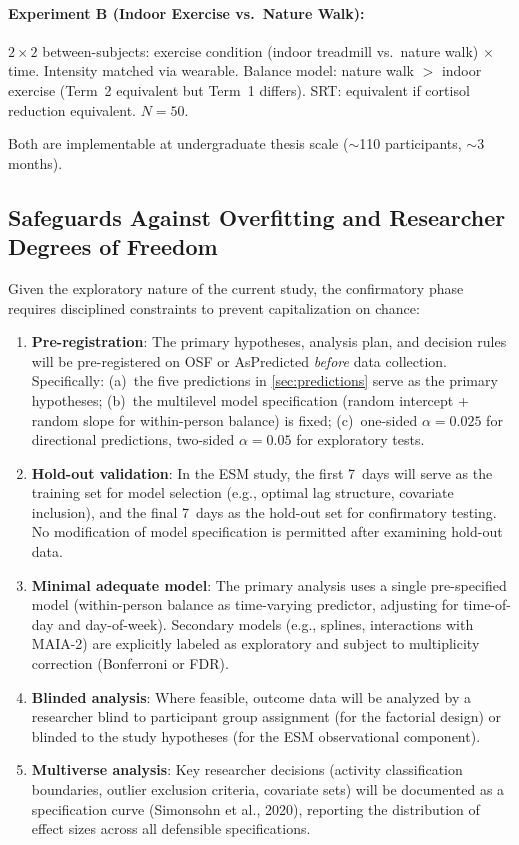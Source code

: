 \documentclass[a4paper,11pt,titlepage]{article}
\begin{document}
\paragraph{Experiment B (Indoor Exercise vs.\ Nature Walk):}
$2 \times 2$ between-subjects: exercise condition (indoor treadmill vs.\ nature walk) $\times$ time. Intensity matched via wearable. Balance model: nature walk $>$ indoor exercise (Term~2 equivalent but Term~1 differs). SRT: equivalent if cortisol reduction equivalent. $N = 50$.

Both are implementable at undergraduate thesis scale ($\sim$110 participants, $\sim$3 months).

\subsection{Safeguards Against Overfitting and Researcher Degrees of Freedom}\label{sec:safeguards}

Given the exploratory nature of the current study, the confirmatory phase requires disciplined constraints to prevent capitalization on chance:

\begin{enumerate}
  \item \textbf{Pre-registration}: The primary hypotheses, analysis plan, and decision rules will be pre-registered on OSF or AsPredicted \emph{before} data collection. Specifically: (a)~the five predictions in \cref{sec:predictions} serve as the primary hypotheses; (b)~the multilevel model specification (random intercept + random slope for within-person balance) is fixed; (c)~one-sided $\alpha = 0.025$ for directional predictions, two-sided $\alpha = 0.05$ for exploratory tests.
  \item \textbf{Hold-out validation}: In the ESM study, the first 7~days will serve as the training set for model selection (e.g., optimal lag structure, covariate inclusion), and the final 7~days as the hold-out set for confirmatory testing. No modification of model specification is permitted after examining hold-out data.
  \item \textbf{Minimal adequate model}: The primary analysis uses a single pre-specified model (within-person balance as time-varying predictor, adjusting for time-of-day and day-of-week). Secondary models (e.g., splines, interactions with MAIA-2) are explicitly labeled as exploratory and subject to multiplicity correction (Bonferroni or FDR).
  \item \textbf{Blinded analysis}: Where feasible, outcome data will be analyzed by a researcher blind to participant group assignment (for the factorial design) or blinded to the study hypotheses (for the ESM observational component).
  \item \textbf{Multiverse analysis}: Key researcher decisions (activity classification boundaries, outlier exclusion criteria, covariate sets) will be documented as a specification curve (Simonsohn et al., 2020), reporting the distribution of effect sizes across all defensible specifications.
\end{enumerate}
\end{document}
